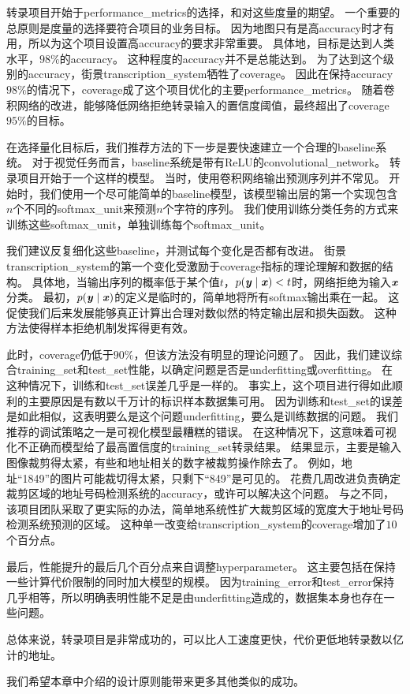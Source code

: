 转录项目开始于\gls{performance_metrics}的选择，和对这些度量的期望。
一个重要的总原则是度量的选择要符合项目的业务目标。
因为地图只有是高\gls{accuracy}时才有用，所以为这个项目设置高\gls{accuracy}的要求非常重要。
具体地，目标是达到人类水平，$98\%$的\gls{accuracy}。
这种程度的\gls{accuracy}并不是总能达到。
为了达到这个级别的\gls{accuracy}，街景\gls{transcription_system}牺牲了\gls{coverage}。
因此在保持\gls{accuracy} $98\%$的情况下，\gls{coverage}成了这个项目优化的主要\gls{performance_metrics}。
随着卷积网络的改进，能够降低网络拒绝转录输入的置信度阈值，最终超出了\gls{coverage} $95\%$的目标。


在选择量化目标后，我们推荐方法的下一步是要快速建立一个合理的\gls{baseline}系统。
对于视觉任务而言，\gls{baseline}系统是带有\gls{ReLU}的\gls{convolutional_network}。
转录项目开始于一个这样的模型。
当时，使用卷积网络输出预测序列并不常见。
开始时，我们使用一个尽可能简单的\gls{baseline}模型，该模型输出层的第一个实现包含$n$个不同的\gls{softmax_unit}来预测$n$个字符的序列。
我们使用训练分类任务的方式来训练这些\gls{softmax_unit}，单独训练每个\gls{softmax_unit}。


我们建议反复细化这些\gls{baseline}，并测试每个变化是否都有改进。
街景\gls{transcription_system}的第一个变化受激励于\gls{coverage}指标的理论理解和数据的结构。
具体地，当输出序列的概率低于某个值$t$，$p(\boldsymbol{\mathit{y}}\mid\boldsymbol{\mathit{x}}) < t$时，网络拒绝为输入$\boldsymbol{\mathit{x}}$分类。
最初，$p(\boldsymbol{\mathit{y}}\mid\boldsymbol{\mathit{x}})$的定义是临时的，简单地将所有\gls{softmax}输出乘在一起。
这促使我们后来发展能够真正计算出合理对数似然的特定输出层和损失函数。
这种方法使得样本拒绝机制发挥得更有效。


此时，\gls{coverage}仍低于$90\%$，但该方法没有明显的理论问题了。
因此，我们建议综合\gls{training_set}和\gls{test_set}性能，以确定问题是否是\gls{underfitting}或\gls{overfitting}。
在这种情况下，训练和\gls{test_set}误差几乎是一样的。
事实上，这个项目进行得如此顺利的主要原因是有数以千万计的标识样本数据集可用。
因为训练和\gls{test_set}的误差是如此相似，这表明要么是这个问题\gls{underfitting}，要么是训练数据的问题。
我们推荐的调试策略之一是可视化模型最糟糕的错误。
在这种情况下，这意味着可视化不正确而模型给了最高置信度的\gls{training_set}转录结果。
结果显示，主要是输入图像裁剪得太紧，有些和地址相关的数字被裁剪操作除去了。
例如，地址``1849''的图片可能裁切得太紧，只剩下``849''是可见的。
花费几周改进负责确定裁剪区域的地址号码检测系统的\gls{accuracy}，或许可以解决这个问题。
与之不同，该项目团队采取了更实际的办法，简单地系统性扩大裁剪区域的宽度大于地址号码检测系统预测的区域。
这种单一改变给\gls{transcription_system}的\gls{coverage}增加了$10$个百分点。


最后，性能提升的最后几个百分点来自调整\gls{hyperparameter}。
这主要包括在保持一些计算代价限制的同时加大模型的规模。
因为\gls{training_error}和\gls{test_error}保持几乎相等，所以明确表明性能不足是由\gls{underfitting}造成的，数据集本身也存在一些问题。


总体来说，转录项目是非常成功的，可以比人工速度更快，代价更低地转录数以亿计的地址。

我们希望本章中介绍的设计原则能带来更多其他类似的成功。

